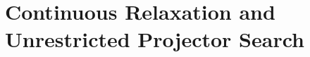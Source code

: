\section{Continuous Relaxation and Unrestricted Projector Search}
\label{sec:continuous-relaxation}

%
%
%
